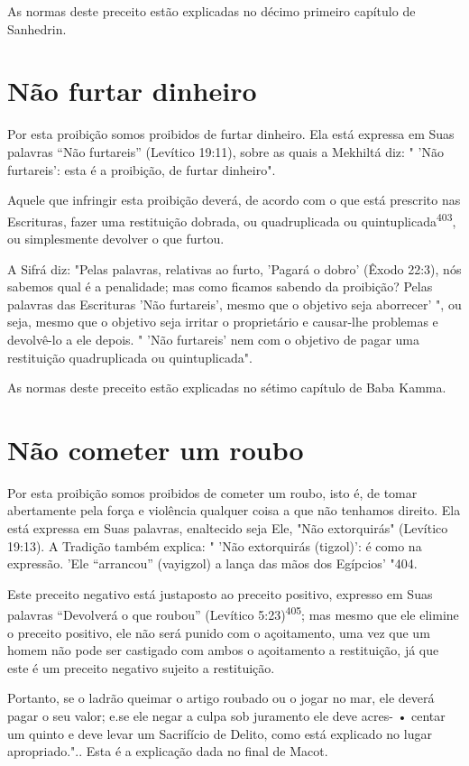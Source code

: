 As normas deste preceito estão explicadas no décimo primeiro capí­tulo de Sanhedrin.

\section{Não furtar dinheiro}

Por esta proibição somos proibidos de furtar dinheiro. Ela está
ex­pressa em Suas palavras ``Não furtareis'' (Levítico 19:11), sobre as
quais a Mek­hiltá diz: " 'Não furtareis': esta é a proibição, de furtar
dinheiro".

Aquele que infringir esta proibição deverá, de acordo com o que es­tá
prescrito nas Escrituras, fazer uma restituição dobrada, ou
quadruplicada ou quintuplicada\textsuperscript{403}, ou simplesmente
devolver o que furtou.

A Sifrá diz: "Pelas palavras, relativas ao furto, 'Pagará o dobro'
(Êxo­do 22:3), nós sabemos qual é a penalidade; mas como ficamos sabendo
da proi­bição? Pelas palavras das Escrituras 'Não furtareis', mesmo que
o objetivo seja aborrecer' ", ou seja, mesmo que o objetivo seja irritar
o proprietário e causar-lhe problemas e devolvê-lo a ele depois. " 'Não
furtareis' nem com o objetivo de pagar uma restituição quadruplicada ou
quintuplicada".

As normas deste preceito estão explicadas no sétimo capítulo de Ba­ba
Kamma.

\section{Não cometer um roubo}

Por esta proibição somos proibidos de cometer um roubo, isto é, de tomar
abertamente pela força e violência qualquer coisa a que não tenha­mos
direito. Ela está expressa em Suas palavras, enaltecido seja Ele, "Não
ex­torquirás" (Levítico 19:13). A Tradição também explica: " 'Não
extorquirás (tig­zol)': é como na expressão. 'Ele ``arrancou'' (vayigzol)
a lança das mãos dos Egípcios' "404.

Este preceito negativo está justaposto ao preceito positivo, expres­so
em Suas palavras ``Devolverá o que roubou'' (Levítico
5:23)\textsuperscript{405}; mas mes­mo que ele elimine o preceito
positivo, ele não será punido com o açoitamen­to, uma vez que um homem
não pode ser castigado com ambos o açoitamento
 a restituição, já que este é um preceito negativo sujeito a
 restituição.


Portanto, se o ladrão queimar o artigo roubado ou o jogar no mar, ele
deverá pagar o seu valor; e.se ele negar a culpa sob juramento ele deve
acres- • centar um quinto e deve levar um Sacrifício de Delito, como
está explicado no lugar
apropriado.".. Esta é a explicação
dada no final de Macot.

